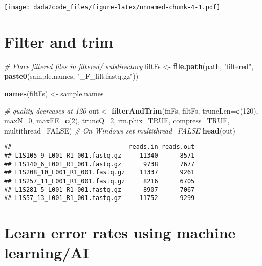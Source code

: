\documentclass[
]{article}
\newenvironment{Shaded}{\begin{snugshade}}{\end{snugshade}}
\newcommand{\AttributeTok}[1]{\textcolor[rgb]{0.13,0.29,0.53}{#1}}
\newcommand{\CommentTok}[1]{\textcolor[rgb]{0.56,0.35,0.01}{\textit{#1}}}
\newcommand{\ConstantTok}[1]{\textcolor[rgb]{0.56,0.35,0.01}{#1}}
\newcommand{\DecValTok}[1]{\textcolor[rgb]{0.00,0.00,0.81}{#1}}
\newcommand{\FunctionTok}[1]{\textcolor[rgb]{0.13,0.29,0.53}{\textbf{#1}}}
\newcommand{\NormalTok}[1]{#1}
\newcommand{\OtherTok}[1]{\textcolor[rgb]{0.56,0.35,0.01}{#1}}
\newcommand{\StringTok}[1]{\textcolor[rgb]{0.31,0.60,0.02}{#1}}
\begin{document}
\texttt{[image: dada2code\_files/figure-latex/unnamed-chunk-4-1.pdf]}

\hypertarget{filter-and-trim}{%
\section{Filter and trim}\label{filter-and-trim}}

\begin{Shaded}
\begin{Highlighting}[]
\CommentTok{\# Place filtered files in filtered/ subdirectory}
\NormalTok{filtFs }\OtherTok{\textless{}{-}} \FunctionTok{file.path}\NormalTok{(path, }\StringTok{"filtered"}\NormalTok{, }\FunctionTok{paste0}\NormalTok{(sample.names, }\StringTok{"\_F\_filt.fastq.gz"}\NormalTok{))}

\FunctionTok{names}\NormalTok{(filtFs) }\OtherTok{\textless{}{-}}\NormalTok{ sample.names}

\CommentTok{\# quality decreases at 120}
\NormalTok{out }\OtherTok{\textless{}{-}} \FunctionTok{filterAndTrim}\NormalTok{(fnFs, filtFs, }\AttributeTok{truncLen=}\FunctionTok{c}\NormalTok{(}\DecValTok{120}\NormalTok{),}
              \AttributeTok{maxN=}\DecValTok{0}\NormalTok{, }\AttributeTok{maxEE=}\FunctionTok{c}\NormalTok{(}\DecValTok{2}\NormalTok{), }\AttributeTok{truncQ=}\DecValTok{2}\NormalTok{, }\AttributeTok{rm.phix=}\ConstantTok{TRUE}\NormalTok{,}
              \AttributeTok{compress=}\ConstantTok{TRUE}\NormalTok{, }\AttributeTok{multithread=}\ConstantTok{FALSE}\NormalTok{) }\CommentTok{\# On Windows set multithread=FALSE}
\FunctionTok{head}\NormalTok{(out)}
\end{Highlighting}
\end{Shaded}

\begin{verbatim}
##                                reads.in reads.out
## L1S105_9_L001_R1_001.fastq.gz     11340      8571
## L1S140_6_L001_R1_001.fastq.gz      9738      7677
## L1S208_10_L001_R1_001.fastq.gz    11337      9261
## L1S257_11_L001_R1_001.fastq.gz     8216      6705
## L1S281_5_L001_R1_001.fastq.gz      8907      7067
## L1S57_13_L001_R1_001.fastq.gz     11752      9299
\end{verbatim}

\hypertarget{learn-error-rates-using-machine-learningai}{%
\section{Learn error rates using machine
learning/AI}\label{learn-error-rates-using-machine-learningai}}
\end{document}
